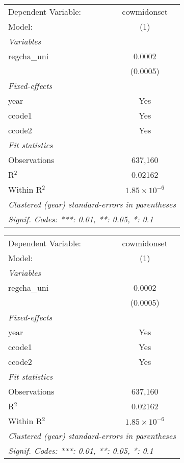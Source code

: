 
\begingroup
\centering
\begin{tabular}{lc}
   \tabularnewline \midrule \midrule
   Dependent Variable: & cowmidonset\\  
   Model:              & (1)\\  
   \midrule
   \emph{Variables}\\
   regcha\_uni         & 0.0002\\   
                       & (0.0005)\\   
   \midrule
   \emph{Fixed-effects}\\
   year                & Yes\\  
   ccode1              & Yes\\  
   ccode2              & Yes\\  
   \midrule
   \emph{Fit statistics}\\
   Observations        & 637,160\\  
   R$^2$               & 0.02162\\  
   Within R$^2$        & $1.85\times 10^{-6}$\\   
   \midrule \midrule
   \multicolumn{2}{l}{\emph{Clustered (year) standard-errors in parentheses}}\\
   \multicolumn{2}{l}{\emph{Signif. Codes: ***: 0.01, **: 0.05, *: 0.1}}\\
\end{tabular}
\par\endgroup



\begingroup
\centering
\begin{tabular}{lc}
   \tabularnewline \midrule \midrule
   Dependent Variable: & cowmidonset\\  
   Model:              & (1)\\  
   \midrule
   \emph{Variables}\\
   regcha\_uni         & 0.0002\\   
                       & (0.0005)\\   
   \midrule
   \emph{Fixed-effects}\\
   year                & Yes\\  
   ccode1              & Yes\\  
   ccode2              & Yes\\  
   \midrule
   \emph{Fit statistics}\\
   Observations        & 637,160\\  
   R$^2$               & 0.02162\\  
   Within R$^2$        & $1.85\times 10^{-6}$\\   
   \midrule \midrule
   \multicolumn{2}{l}{\emph{Clustered (year) standard-errors in parentheses}}\\
   \multicolumn{2}{l}{\emph{Signif. Codes: ***: 0.01, **: 0.05, *: 0.1}}\\
\end{tabular}
\par\endgroup



